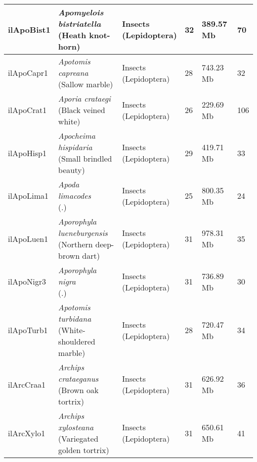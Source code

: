\begin{centering}
\begin{longtable}{l|l|l|l|l|l}
ilApoBist1 & \makecell[{l}]{\textit{Apomyelois bistriatella} \\ (Heath knot-horn)} & \makecell[{l}]{Insects \\ (Lepidoptera)} & 32 & 389.57 Mb & 70  \\ \hline
ilApoCapr1 & \makecell[{l}]{\textit{Apotomis capreana} \\ (Sallow marble)} & \makecell[{l}]{Insects \\ (Lepidoptera)} & 28 & 743.23 Mb & 32  \\ \hline
ilApoCrat1 & \makecell[{l}]{\textit{Aporia crataegi} \\ (Black veined white)} & \makecell[{l}]{Insects \\ (Lepidoptera)} & 26 & 229.69 Mb & 106  \\ \hline
ilApoHisp1 & \makecell[{l}]{\textit{Apocheima hispidaria} \\ (Small brindled beauty)} & \makecell[{l}]{Insects \\ (Lepidoptera)} & 29 & 419.71 Mb & 33  \\ \hline
ilApoLima1 & \makecell[{l}]{\textit{Apoda limacodes} \\ (.)} & \makecell[{l}]{Insects \\ (Lepidoptera)} & 25 & 800.35 Mb & 24  \\ \hline
ilApoLuen1 & \makecell[{l}]{\textit{Aporophyla lueneburgensis} \\ (Northern deep-brown dart)} & \makecell[{l}]{Insects \\ (Lepidoptera)} & 31 & 978.31 Mb & 35  \\ \hline
ilApoNigr3 & \makecell[{l}]{\textit{Aporophyla nigra} \\ (.)} & \makecell[{l}]{Insects \\ (Lepidoptera)} & 31 & 736.89 Mb & 30  \\ \hline
ilApoTurb1 & \makecell[{l}]{\textit{Apotomis turbidana} \\ (White-shouldered marble)} & \makecell[{l}]{Insects \\ (Lepidoptera)} & 28 & 720.47 Mb & 34  \\ \hline
ilArcCraa1 & \makecell[{l}]{\textit{Archips crataeganus} \\ (Brown oak tortrix)} & \makecell[{l}]{Insects \\ (Lepidoptera)} & 31 & 626.92 Mb & 36  \\ \hline
ilArcXylo1 & \makecell[{l}]{\textit{Archips xylosteana} \\ (Variegated golden tortrix)} & \makecell[{l}]{Insects \\ (Lepidoptera)} & 31 & 650.61 Mb & 41  \\ \hline

\end{longtable}
\end{centering}
